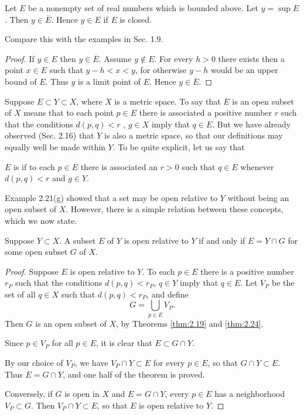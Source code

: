 \begin{thm}
    \label{thm:2.28}
    Let $E$ be a nonempty set of real numbers which is bounded above.     Let $y = \sup E$. Then $y \in \overline{E}$. Hence $y \in E$ if $E$ is closed.
\end{thm}
Compare this with the examples in Sec. 1.9.
\begin{proof}
    If $y \in E$ then $y \in \overline{E}$. 
    Assume $y \not\in E$. 
    For every $h > 0$ there exists then a point $x \in E$ 
    such that $y - h < x < y$, 
    for otherwise $y - h$ would be an upper bound of $E$. 
    Thus $y$ is a limit point of $E$. Hence $y \in \overline{E}$.
\end{proof}

\begin{myremark}
    Suppose $E \subset Y \subset X$, where $X$ is a metric space. To say that $E$ is an open subset of $X$ means that to each point $p \in E$ there is associated a positive number $r$ such that the conditions $d(p,q) < r$ , $g \in X$ imply that $q \in E$. But we have already observed (Sec. 2.16) that $Y$ is also a metric space, so that our definitions may equally well be made within $Y$. To be quite explicit, let us say that 
    
    $E$ is  if to each $p \in E$ there is associated an $r > 0$ such that $q \in E$ whenever $d(p,q) <r$ and $g \in Y$. 
    
    Example 2.21(g) showed that a set may be open relative to $Y$ without being an open subset of $X$. However, there is a simple relation between these concepts, which we now state.
\end{myremark}

\begin{thm}
    \label{thm:2.30}
    Suppose $Y \subset X$. A subset $E$ of $Y$ is open relative to $Y$ if and only if $E = Y \cap G$ for some open subset $G$ of $X$.
\end{thm}
\begin{proof}
    Suppose $E$ is open relative to $Y$. 
    To each $p \in E$ there is a positive number $r_P$ 
    such that the conditions $d(p, q) < r_P$, 
    $q \in Y$ imply that $q \in E$. 
    Let $V_P$ be the set of all $q \in X$ 
    such that $d(p, q) < r_P$, and define
    \begin{equation*}
        G = \bigcup_{p \in E} V_P.
    \end{equation*}
    Then $G$ is an open subset of $X$, by Theorems \ref{thm:2.19} and \ref{thm:2.24}. 

    Since $p \in V_P$ for all $p \in E$, 
    it is clear that $E \subset G \cap Y$.
    
    By our choice of $V_P$, 
    we have $V_P \cap Y \subset E$ for every $p \in E$, 
    so that $G \cap Y \subset E$. 
    Thus $E = G \cap Y$, and one half of the theorem is proved.
    
    Conversely, if $G$ is open in $X$ and $E = G \cap Y$, 
    every $p \in E$ has a neighborhood $V_P \subset G$. 
    Then $V_P \cap Y \subset E$, 
    so that $E$ is open relative to $Y$.
\end{proof}